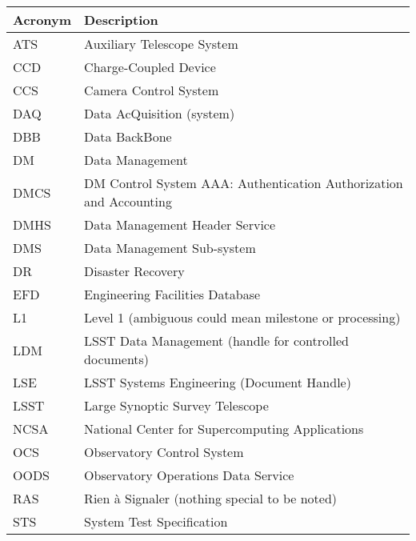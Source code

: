 \addtocounter{table}{-1}
\begin{longtable}{|l|p{}|}\hline
\textbf{Acronym} & \textbf{Description}  \\\hline

ATS & Auxiliary Telescope System \\\hline
CCD & Charge-Coupled Device \\\hline
CCS & Camera Control System \\\hline
DAQ & Data AcQuisition (system) \\\hline
DBB & Data BackBone \\\hline
DM & Data Management \\\hline
DMCS & DM Control System AAA: Authentication Authorization and Accounting \\\hline
DMHS & Data Management Header Service \\\hline
DMS & Data Management Sub-system \\\hline
DR & Disaster Recovery \\\hline
EFD & Engineering Facilities Database \\\hline
L1 & Level 1 (ambiguous could mean milestone or processing) \\\hline
LDM & LSST Data Management (handle for controlled documents) \\\hline
LSE & LSST Systems Engineering (Document Handle) \\\hline
LSST & Large Synoptic Survey Telescope \\\hline
NCSA & National Center for Supercomputing Applications \\\hline
OCS & Observatory Control System \\\hline
OODS & Observatory Operations Data Service \\\hline
RAS & Rien \`a Signaler (nothing special to be noted) \\\hline
STS & System Test Specification \\\hline
\end{longtable}
